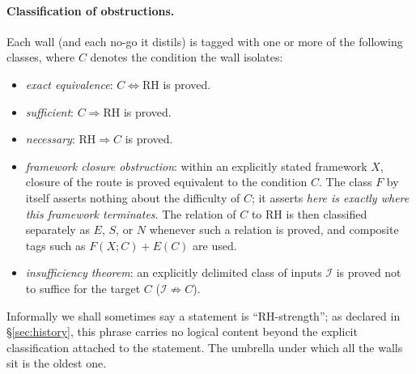 \documentclass[11pt]{amsart}
\theoremstyle{definition}
\theoremstyle{remark}
\theoremstyle{definition}
\begin{document}
\paragraph{Classification of obstructions.} Each wall (and each no-go it distils) is tagged with one or
more of the following classes, where $C$ denotes the condition the wall isolates:
\begin{itemize}[leftmargin=2.2em]
\item[$E(C)$] \emph{exact equivalence}: $C\Longleftrightarrow\mathrm{RH}$ is proved.
\item[$S(C)$] \emph{sufficient}: $C\Longrightarrow\mathrm{RH}$ is proved.
\item[$N(C)$] \emph{necessary}: $\mathrm{RH}\Longrightarrow C$ is proved.
\item[$F(X;C)$] \emph{framework closure obstruction}: within an explicitly stated framework $X$, closure
of the route is proved equivalent to the condition $C$.  The class $F$ by itself asserts nothing about the
difficulty of $C$; it asserts \emph{here is exactly where this framework terminates}.  The relation of $C$
to RH is then classified separately as $E$, $S$, or $N$ whenever such a relation is proved, and composite
tags such as $F(X;C)+E(C)$ are used.
\item[$I(\mathcal I;C)$] \emph{insufficiency theorem}: an explicitly delimited class of inputs
$\mathcal I$ is proved not to suffice for the target $C$ ($\mathcal I\not\Rightarrow C$).
\end{itemize}
Informally we shall sometimes say a statement is ``RH-strength''; as declared in
\S\ref{sec:history}, this phrase carries no logical content beyond the explicit classification attached to
the statement.  The umbrella under which all the walls sit is the oldest one.
\end{document}

